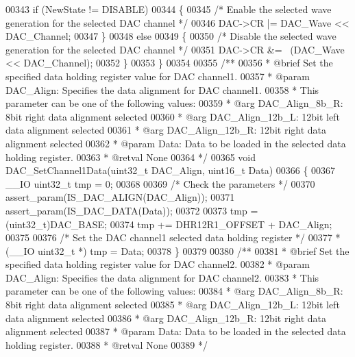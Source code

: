 \begin{DoxyCode}
00343   \textcolor{keywordflow}{if} (NewState != DISABLE)
00344   \{
00345     \textcolor{comment}{/* Enable the selected wave generation for the selected DAC channel */}
00346     DAC->CR |= DAC\_Wave << DAC\_Channel;
00347   \}
00348   \textcolor{keywordflow}{else}
00349   \{
00350     \textcolor{comment}{/* Disable the selected wave generation for the selected DAC channel */}
00351     DAC->CR &= ~(DAC\_Wave << DAC\_Channel);
00352   \}
00353 \}
00354 
00355 \textcolor{comment}{/**}
00356 \textcolor{comment}{  * @brief  Set the specified data holding register value for DAC channel1.}
00357 \textcolor{comment}{  * @param  DAC\_Align: Specifies the data alignment for DAC channel1.}
00358 \textcolor{comment}{  *          This parameter can be one of the following values:}
00359 \textcolor{comment}{  *            @arg DAC\_Align\_8b\_R: 8bit right data alignment selected}
00360 \textcolor{comment}{  *            @arg DAC\_Align\_12b\_L: 12bit left data alignment selected}
00361 \textcolor{comment}{  *            @arg DAC\_Align\_12b\_R: 12bit right data alignment selected}
00362 \textcolor{comment}{  * @param  Data: Data to be loaded in the selected data holding register.}
00363 \textcolor{comment}{  * @retval None}
00364 \textcolor{comment}{  */}
00365 \textcolor{keywordtype}{void} DAC_SetChannel1Data(uint32\_t DAC\_Align, uint16\_t Data)
00366 \{
00367   \_\_IO uint32\_t tmp = 0;
00368 
00369   \textcolor{comment}{/* Check the parameters */}
00370   assert_param(IS\_DAC\_ALIGN(DAC\_Align));
00371   assert_param(IS\_DAC\_DATA(Data));
00372 
00373   tmp = (uint32\_t)DAC_BASE;
00374   tmp += DHR12R1_OFFSET + DAC\_Align;
00375 
00376   \textcolor{comment}{/* Set the DAC channel1 selected data holding register */}
00377   *(\_\_IO uint32\_t *) tmp = Data;
00378 \}
00379 
00380 \textcolor{comment}{/**}
00381 \textcolor{comment}{  * @brief  Set the specified data holding register value for DAC channel2.}
00382 \textcolor{comment}{  * @param  DAC\_Align: Specifies the data alignment for DAC channel2.}
00383 \textcolor{comment}{  *          This parameter can be one of the following values:}
00384 \textcolor{comment}{  *            @arg DAC\_Align\_8b\_R: 8bit right data alignment selected}
00385 \textcolor{comment}{  *            @arg DAC\_Align\_12b\_L: 12bit left data alignment selected}
00386 \textcolor{comment}{  *            @arg DAC\_Align\_12b\_R: 12bit right data alignment selected}
00387 \textcolor{comment}{  * @param  Data: Data to be loaded in the selected data holding register.}
00388 \textcolor{comment}{  * @retval None}
00389 \textcolor{comment}{  */}

\end{DoxyCode}
